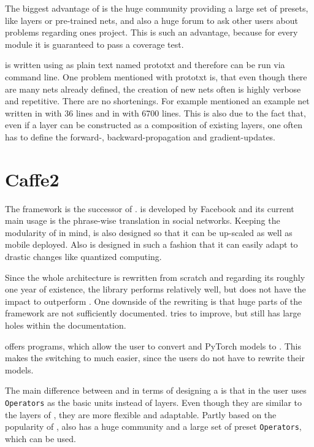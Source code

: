 The biggest advantage of \caffe is the huge community providing a large set of presets, like layers or pre-trained nets, and also a huge forum to ask other users about problems regarding ones project. This is such an advantage, because for every module it is  guaranteed to pass a coverage test. \cite{jia2014caffe}

\caffe is written using as plain text named prototxt and therefore can be run via command line. One problem mentioned with prototxt is, that even though there are many nets already defined, the creation of new nets often is highly verbose and repetitive. There are no shortenings. For example \cite{tim2018CNNArchLang} mentioned an example net written in \cnnarch with 36 lines and in \caffe with 6700 lines. This is also due to the fact that, even if a layer can be constructed as a composition of existing layers, one often has to define the forward-, backward-propagation and gradient-updates.

\section{Caffe2} \label{sec: Caffe2}
The framework \caffetwo is the successor of \caffe. \caffetwo is developed by Facebook and its current main usage is the phrase-wise translation in social networks. Keeping the modularity of \caffe in mind, \caffetwo is also designed so that it can be up-scaled as well as mobile deployed. Also \caffetwo is designed in such a fashion that it can easily adapt to drastic changes like quantized computing. \cite{Caffe2Homepage}

Since the whole architecture is rewritten from scratch and regarding its roughly one year of existence, the library performs relatively well, but does not have the impact to outperform \caffe \cite{heise:Caffe2}.
One downside of the rewriting is that huge parts of the framework are not sufficiently documented. \caffetwo tries to improve, but still has large holes within the documentation. \cite{tim2018CNNArchLang}

\caffetwo offers programs, which allow the user to convert \caffe and PyTorch models to \caffetwo. This makes the switching to \caffetwo much easier, since the users do not have to rewrite their models. \cite{Caffe2Homepage}

The main difference between \caffe and \caffetwo in terms of designing a \nn is that in \caffetwo the user uses \texttt{Operators} as the basic units instead of layers. Even though they are similar to the layers of \caffe, they are more flexible and adaptable. Partly based on the popularity of \caffe, \caffetwo also has a huge community and a large set of preset \texttt{Operators}, which can be used. \cite{Caffe2Homepage}

